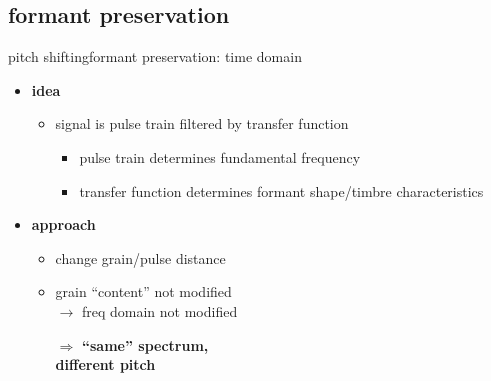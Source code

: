         \subsection{formant preservation}   
        \begin{frame}{pitch shifting}{formant preservation: time domain}
	\begin{itemize}
		\item 	\textbf{idea}
			\begin{itemize}
				\item 	signal is pulse train filtered by transfer function
					\pause
					\begin{itemize}
						\item 	pulse train determines fundamental frequency
						\item	transfer function determines formant shape/timbre characteristics
					\end{itemize}
			\end{itemize}
		\pause
        \bigskip
		\item	\textbf{approach}
			\begin{itemize}
				\item	change grain/pulse distance
				\item	grain ``content'' not modified\\ $\rightarrow$ freq domain not modified
				\pause
                \bigskip
				\item[$\Rightarrow$]	\textbf{``same'' spectrum,\\ different pitch}
			\end{itemize}
	\end{itemize}
    \vspace{-30mm}
        \end{frame}
